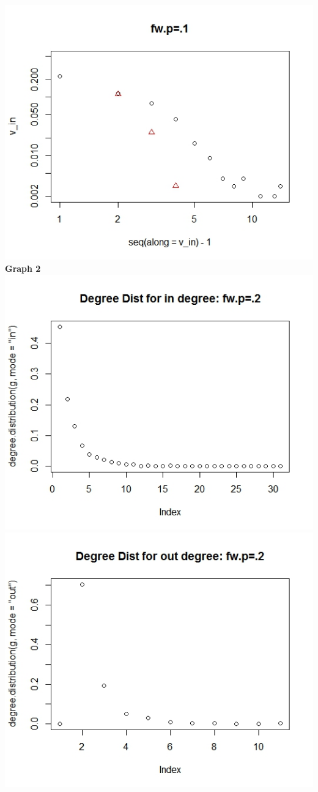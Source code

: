 \documentclass{article}
\begin{document}
\includegraphics[scale=0.4]{pd5} \\
\textbf{Graph 2}\\
\includegraphics[scale=0.4]{pd6} \\
\includegraphics[scale=0.4]{pd7} \\
\end{document}
